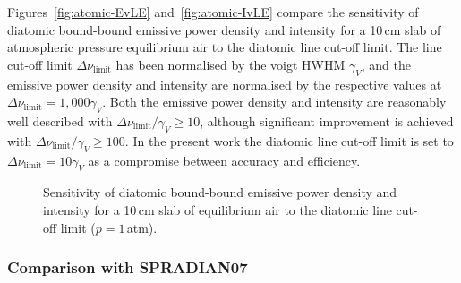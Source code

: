 Figures~\ref{fig:atomic-EvLE} and~\ref{fig:atomic-IvLE} compare the sensitivity of diatomic bound-bound emissive power density and intensity for a 10\,cm slab of atmospheric pressure equilibrium air to the diatomic line cut-off limit.
The line cut-off limit $\Delta \nu_\text{limit}$ has been normalised by the voigt HWHM $\gamma_V$, and the emissive power density and intensity are normalised by the respective values at $\Delta \nu_\text{limit} = 1,000 \gamma_V$.
Both the emissive power density and intensity are reasonably well described with $\Delta \nu_\text{limit} / \gamma_V \geq 10$, although significant improvement is achieved with $\Delta \nu_\text{limit} / \gamma_V \geq 100$.
In the present work the diatomic line cut-off limit is set to $\Delta \nu_\text{limit} = 10 \gamma_V$ as a compromise between accuracy and efficiency.

\begin{figure}[h]
 \centering
 \caption{Sensitivity of diatomic bound-bound emissive power density and intensity for a 10\,cm slab of equilibrium air to the diatomic line cut-off limit ($p=1$\,atm).}
 \label{fig:diatomic_LE_sensitivity}
\end{figure}

\subsubsection{Comparison with SPRADIAN07}

